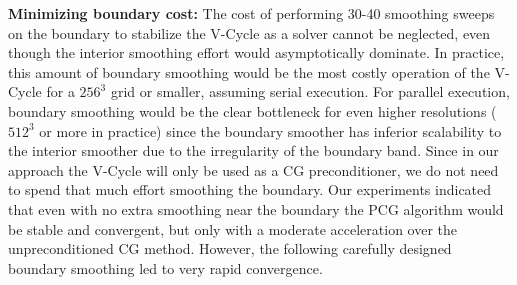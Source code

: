 
\textbf{Minimizing boundary cost:} The cost of performing 30-40 smoothing sweeps on the boundary to stabilize the V-Cycle as a solver cannot be neglected, even though the interior
smoothing effort would asymptotically dominate. In practice, this amount of boundary smoothing would be the most costly operation of the V-Cycle for a $256^3$ grid or smaller, assuming serial
execution. For parallel execution, boundary smoothing would be the clear bottleneck for even higher resolutions ($512^3$ or more in practice) since the boundary smoother has inferior
scalability to the interior smoother due to the irregularity of the boundary band. Since in our approach the V-Cycle will only be used as a CG preconditioner, we do not need to spend
that much effort smoothing the boundary. Our experiments indicated that even with no extra smoothing near the boundary the PCG algorithm would be stable and convergent, but only with a
moderate acceleration over the unpreconditioned CG method. However, the following carefully designed boundary smoothing led to very rapid convergence.


